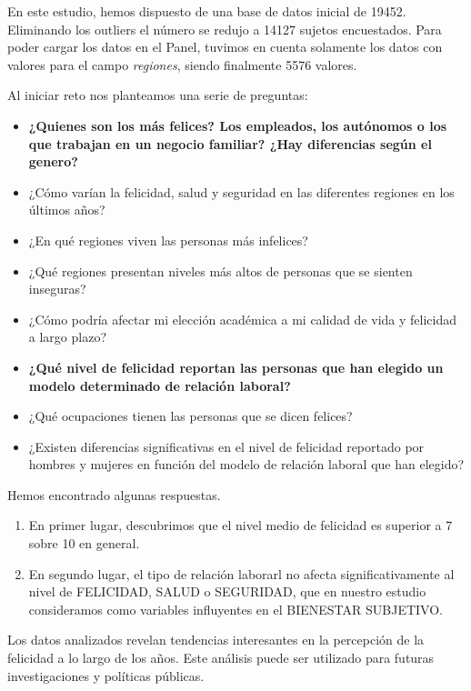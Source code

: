 \documentclass{report}
\begin{document}
En este estudio, hemos dispuesto de una base de datos inicial de  19452. Eliminando los outliers el número se redujo a   14127 sujetos encuestados. Para poder cargar los datos en el Panel, tuvimos en cuenta solamente los datos con valores para el campo \emph{regiones}, siendo finalmente  5576 valores.

Al iniciar reto nos planteamos una serie de preguntas:

\begin{itemize}
\item \textbf{¿Quienes son los más felices? Los empleados, los autónomos o los que trabajan en un negocio
familiar? ¿Hay diferencias según el genero?}
\item ¿Cómo varían la felicidad, salud y seguridad en las diferentes regiones en los últimos años?
\item ¿En qué regiones viven las personas más infelices?
\item ¿Qué regiones presentan niveles más altos de personas que se sienten inseguras?
\item ¿Cómo podría afectar mi elección académica a mi calidad de vida y felicidad a largo plazo?
\item \textbf{¿Qué nivel de felicidad reportan las personas que han elegido un modelo determinado de relación
laboral?}
\item ¿Qué ocupaciones tienen las personas que se dicen felices? 
\item ¿Existen diferencias significativas en el nivel de felicidad reportado por hombres y mujeres en
función del modelo de relación laboral que han elegido?
\end{itemize}

Hemos encontrado algunas respuestas. 

\begin{enumerate}
\item En primer lugar, descubrimos que el nivel medio de felicidad es superior a 7 sobre 10 en general.
\item En segundo lugar, el tipo de relación laborarl no afecta significativamente al nivel de FELICIDAD, SALUD o SEGURIDAD, que en nuestro estudio consideramos como variables influyentes en el BIENESTAR SUBJETIVO.

\end{enumerate}

Los datos analizados revelan tendencias interesantes en la percepción de la felicidad a lo largo de los años. Este análisis puede ser utilizado para futuras investigaciones y políticas públicas.






\end{document}
